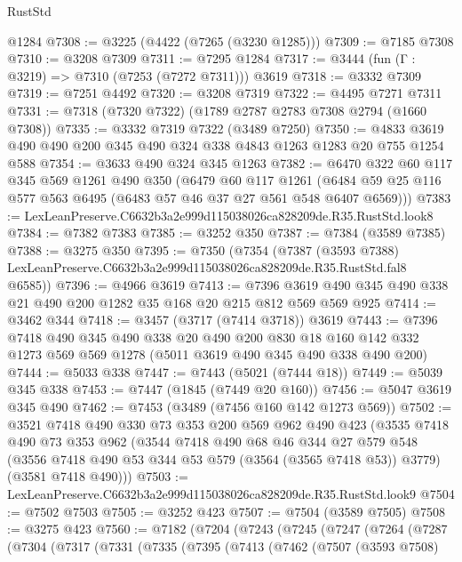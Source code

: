 \begin{lexlean}{RustStd}
\begin{coremodule}
    @1284
@7308 := @3225 (@4422 (@7265 (@3230 @1285)))
@7309 := @7185 @7308
@7310 := @3208 @7309
@7311 := @7295 @1284
@7317 := @3444 (fun (Γ : @3219) => @7310 (@7253 (@7272 @7311))) @3619
@7318 := @3332 @7309
@7319 := @7251 @4492
@7320 := @3208 @7319
@7322 := @4495 @7271 @7311
@7331 := @7318 (@7320 @7322) (@1789 @2787 @2783 @7308 @2794 (@1660 @7308))
@7335 := @3332 @7319 @7322 (@3489 @7250)
@7350 := @4833 @3619 @490 @490 @200 @345 @490 @324 @338 @4843 @1263 @1283 @20 @755 @1254 @588
@7354 := @3633 @490 @324 @345 @1263
@7382 := @6470
    @322
    @60
    @117
    @345
    @569
    @1261
    @490
    @350
    (@6479
      @60
      @117
      @1261
      (@6484 @59 @25 @116 @577 @563 @6495 (@6483 @57 @46 @37 @27 @561 @548 @6407 @6569)))
@7383 := LexLeanPreserve.C6632b3a2e999d115038026ca828209de.R35.RustStd.look8
@7384 := @7382 @7383
@7385 := @3252 @350
@7387 := @7384 (@3589 @7385)
@7388 := @3275 @350
@7395 := @7350
    (@7354
      (@7387
        (@3593 @7388)
        LexLeanPreserve.C6632b3a2e999d115038026ca828209de.R35.RustStd.fal8
        @6585))
@7396 := @4966 @3619
@7413 := @7396 @3619 @490 @345 @490 @338 @21 @490 @200 @1282 @35 @168 @20 @215 @812 @569 @569 @925
@7414 := @3462 @344
@7418 := @3457 (@3717 (@7414 @3718)) @3619
@7443 := @7396
    @7418
    @490
    @345
    @490
    @338
    @20
    @490
    @200
    @830
    @18
    @160
    @142
    @332
    @1273
    @569
    @569
    @1278
    (@5011 @3619 @490 @345 @490 @338 @490 @200)
@7444 := @5033 @338
@7447 := @7443 (@5021 (@7444 @18))
@7449 := @5039 @345 @338
@7453 := @7447 (@1845 (@7449 @20 @160))
@7456 := @5047 @3619 @345 @490
@7462 := @7453 (@3489 (@7456 @160 @142 @1273 @569))
@7502 := @3521
    @7418
    @490
    @330
    @73
    @353
    @200
    @569
    @962
    @490
    @423
    (@3535
      @7418
      @490
      @73
      @353
      @962
      (@3544
        @7418
        @490
        @68
        @46
        @344
        @27
        @579
        @548
        (@3556 @7418 @490 @53 @344 @53 @579 (@3564 (@3565 @7418 @53)) @3779)
        (@3581 @7418 @490)))
@7503 := LexLeanPreserve.C6632b3a2e999d115038026ca828209de.R35.RustStd.look9
@7504 := @7502 @7503
@7505 := @3252 @423
@7507 := @7504 (@3589 @7505)
@7508 := @3275 @423
@7560 := @7182
    (@7204
      (@7243
        (@7245
          (@7247
            (@7264
              (@7287
                (@7304
                  (@7317
                    (@7331
                      (@7335
                        (@7395
                          (@7413
                            (@7462
                              (@7507
                                (@3593 @7508)

\end{coremodule}
\end{lexlean}
